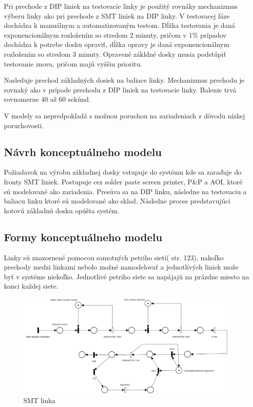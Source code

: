 \documentclass[12pt,a4paper,titlepage,final]{article}
\begin{document}
Pri prechode z DIP liniek na testovacie linky je použitý rovnáky mechanizmus
výberu linky ako pri prechode z SMT liniek na DIP linky. V testovacej fáze 
dochádza k manuálnym a automatizovaným testom. Dĺžka testovania je daná 
exponencionálnym rozložením so stredom 2 minuty, pričom v 1\% prípadov dochádza
k potrebe dosku opraviť, dĺžka opravy je daná exponencionálnym rozložením so
stredom 3 minuty. Opravené zákldné dosky musia podstúpiť testovanie znova, pričom
majú vyššiu prioritu.

Nasleduje prechod základných dosiek na baliace linky. Mechanizmus prechodu je
rovnaký ako v prípade prechodu z DIP liniek na testovacie linky. Balenie trvá 
rovnomerne 40 až 60 sekúnd.

V modely sa nepredpokladá s možnou poruchou na zariadeniach z dôvodu nízkej
poruchovosti.

\subsection{Návrh konceptuálneho modelu}
Požiadavok na výrobu základnej dosky vstupuje do systému kde sa zaraďuje do fronty
SMT liniek. Postupuje cez solder paste screen printer, P\&P a AOI, ktoré 
sú modelované ako zariadenia. Presúva sa na DIP linku, následne na testovaciu
a baliacu linku ktoré sú modelované ako sklad. Následne proces predstavujúci
hotovú základnú dosku opúšta systém.

\subsection{Formy konceptuálneho modelu}
Linky sú znazornené pomocou samotných petriho sietí(\cite{peringer-slidy} str. 123),
nakoľko prechody medzi linkami nebolo možné namodelovať a jednotlivých liniek 
može byť v systéme niekoľko. Jednotlivé petriho siete sa napájajú na prázdne
miesto na konci každej siete. 

\begin{figure}[!h]
  \centering
  \includegraphics[width=17cm]{doc/smt.png}
  \caption{SMT linka}
\end{figure}
\end{document}
